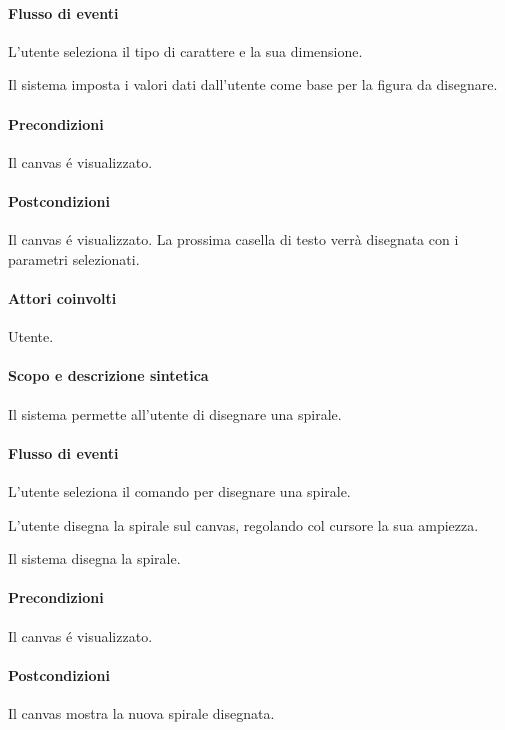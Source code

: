 \paragraph{Flusso di eventi}
\begin{elenconumerato}[\textbf{}]{\subsubsecindent}
\item L'utente seleziona il tipo di carattere e la sua dimensione.
\item Il sistema imposta i valori dati dall'utente come base per la figura da disegnare.
\end{elenconumerato}
\paragraph{Precondizioni} Il canvas \'e visualizzato.
\paragraph{Postcondizioni} Il canvas \'e visualizzato. La prossima casella di testo verr\` a disegnata con i parametri selezionati.

\paragraph{Attori coinvolti} Utente.
\paragraph{Scopo e descrizione sintetica} 
Il sistema permette all'utente di disegnare una spirale.
\paragraph{Flusso di eventi}
\begin{elenconumerato}[\textbf{}]{\subsubsecindent}
\item L'utente seleziona il comando per disegnare una spirale.
\item L'utente disegna la spirale sul canvas, regolando col cursore la sua ampiezza.
\item Il sistema disegna la spirale.
\end{elenconumerato}
\paragraph{Precondizioni} Il canvas \'e visualizzato.
\paragraph{Postcondizioni} Il canvas mostra la nuova spirale disegnata.


